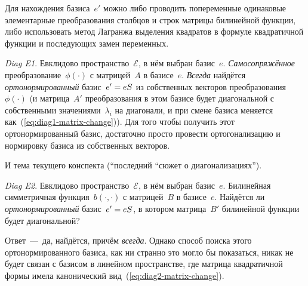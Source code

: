 \documentclass[a4paper,12pt]{article}
\theoremstyle{remark}
\begin{document}
  Для нахождения базиса~$e'$ можно либо проводить попеременные одинаковые элементарные преобразования столбцов и строк матрицы билинейной функции, либо использовать метод Лагранжа выделения квадратов в формуле квадратичной функции и последующих замен переменных.
  
  \smallskip
  
  \emph{Diag E1}.
  Евклидово пространство~$\mathcal E$, в нём выбран базис~$e$.
  \emph{Самосопряжённое} преобразование~$\phi(\cdot)$ с матрицей~$A$ в базисе~$e$.
  \emph{Всегда} найдётся \emph{ортонормированный} базис~$e' \hm= e S$ из собственных векторов преобразования~$\phi(\cdot)$ (и матрица~$A'$ преобразования в этом базисе будет диагональной с собственными значениями~$\lambda_i$ на диагонали, и при смене базиса меняется как~(\ref{eq:diag1-matrix-change})).
  Для того чтобы получить этот ортонормированный базис, достаточно просто провести ортогонализацию и нормировку базиса из собственных векторов.
  
  \smallskip
  
  И тема текущего конспекта (``последний ``сюжет о диагонализациях'').
  
  \smallskip
  
  \emph{Diag E2}.
  Евклидово пространство~$\mathcal E$, в нём выбран базис~$e$.
  Билинейная симметричная функция~$b(\cdot, \cdot)$ с матрицей~$B$ в базисе~$e$.
  Найдётся ли \emph{ортонормированный} базис~$e' \hm= e S$, в котором матрица~$B'$ билинейной функции будет диагональной?
  
  Ответ~---~да, найдётся, причём \emph{всегда}.
  Однако способ поиска этого ортонормированного базиса, как ни странно это могло бы показаться, никак не будет связан с базисом в линейном пространстве, где матрица квадратичной формы имела канонический вид~(\ref{eq:diag2-matrix-change}).
  
\end{document}
